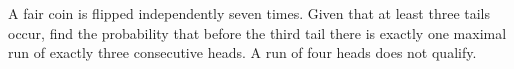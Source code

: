 A fair coin is flipped independently seven times. Given that at least three tails occur, find the probability that before the third tail there is exactly one maximal run of exactly three consecutive heads. A run of four heads does not qualify.
